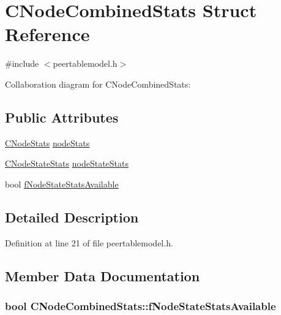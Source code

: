 \hypertarget{struct_c_node_combined_stats}{}\section{C\+Node\+Combined\+Stats Struct Reference}
\label{struct_c_node_combined_stats}


{\ttfamily \#include $<$peertablemodel.\+h$>$}



Collaboration diagram for C\+Node\+Combined\+Stats\+:
\subsection*{Public Attributes}
\begin{DoxyCompactItemize}
\item 
\hyperlink{class_c_node_stats}{C\+Node\+Stats} \hyperlink{struct_c_node_combined_stats_ad26d590ef79b08623b2b6658b59e9a69}{node\+Stats}
\item 
\hyperlink{struct_c_node_state_stats}{C\+Node\+State\+Stats} \hyperlink{struct_c_node_combined_stats_a6ce7320fa9ca5a3706ec4caf76ac34a1}{node\+State\+Stats}
\item 
bool \hyperlink{struct_c_node_combined_stats_adc8bd9241fd1f220059b87398fa10fca}{f\+Node\+State\+Stats\+Available}
\end{DoxyCompactItemize}


\subsection{Detailed Description}


Definition at line 21 of file peertablemodel.\+h.



\subsection{Member Data Documentation}
\hypertarget{struct_c_node_combined_stats_adc8bd9241fd1f220059b87398fa10fca}{}
\subsubsection[{f\+Node\+State\+Stats\+Available}]{\setlength{\rightskip}{0pt plus 5cm}bool C\+Node\+Combined\+Stats\+::f\+Node\+State\+Stats\+Available}\label{struct_c_node_combined_stats_adc8bd9241fd1f220059b87398fa10fca}


